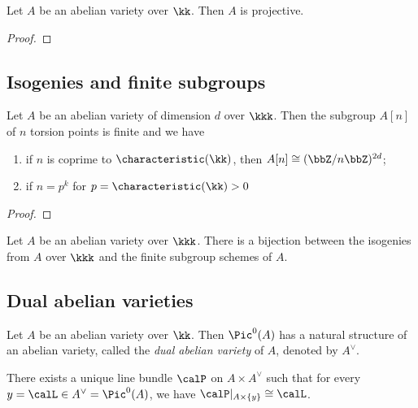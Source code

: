     \begin{theorem}\label{thm: abelian varieties are projective}
        Let $A$ be an abelian variety over $\kk$. 
        Then $A$ is projective.
    \end{theorem}
    \begin{proof}
    \end{proof}


\subsection{Isogenies and finite subgroups}

    \begin{theorem}\label{thm: torsion subgroups of abelian varieties}
        Let \(A\) be an abelian variety of dimension \(d\) over \(\kkk\). 
        Then the subgroup \(A[n]\) of \(n\) torsion points is finite and we have 
        \begin{enumerate}
            \item if \(n\) is coprime to \(\characteristic(\kk)\), then \(A[n] \cong (\bbZ/n\bbZ)^{2d}\);
            \item if \(n = p^k\) for \(p = \characteristic(\kk) > 0\)
        \end{enumerate}
    \end{theorem}
    \begin{proof}
    \end{proof}

    \begin{theorem}\label{thm:isogenies_and_finite_subgroups}
        Let \(A\) be an abelian variety over \(\kkk\). 
        There is a bijection between the isogenies from \(A\) over \(\kkk\) and the finite subgroup schemes of \(A\).
    \end{theorem}


\subsection{Dual abelian varieties}

    \begin{theorem}\label{thm: dual abelian varieties}
        Let $A$ be an abelian variety over $\kk$. 
        Then \(\Pic^0(A) \) has a natural structure of an abelian variety, called the \emph{dual abelian variety} of $A$, denoted by $A^\vee$.
    \end{theorem}

    \begin{proposition}\label{prop: the Poincare line bundle}
        There exists a unique line bundle \(\calP\) on \(A \times A^\vee\) such that for every \(y = \calL \in A^\vee = \Pic^0(A)\), we have \(\calP|_{A \times \{y\}} \cong \calL\).
    \end{proposition}
